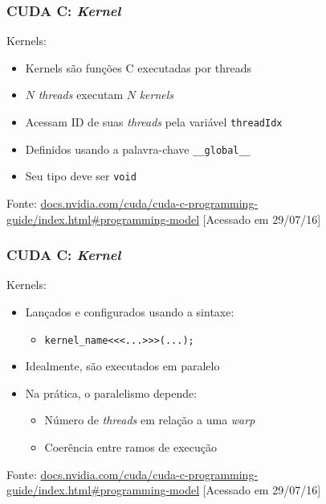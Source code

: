 \documentclass[10pt, compress]{beamer}
\begin{document}
\begin{frame}
    \frametitle{CUDA C: \textit{Kernel}}
    \alert{Kernels}:
    \begin{itemize}
        \item \alert{Kernels} são funções C executadas por \alert{threads}
        \item $N$ \textit{threads} executam $N$ \textit{kernels}
            \pause
        \item Acessam \alert{ID} de suas \textit{threads} pela variável \alert{\texttt{threadIdx}}
            \pause
        \item Definidos usando a palavra-chave \alert{\texttt{\_\_global\_\_}}
        \item Seu tipo deve ser \alert{\texttt{void}}
    \end{itemize}

    \vfill

    \begin{center}
        \tiny{Fonte: \url{docs.nvidia.com/cuda/cuda-c-programming-guide/index.html\#programming-model} [Acessado em 29/07/16]}
    \end{center}
\end{frame}

\begin{frame}
    \frametitle{CUDA C: \textit{Kernel}}
    \alert{Kernels}:
    \begin{itemize}
        \item Lançados e configurados usando a sintaxe:
            \begin{itemize}
                \item \texttt{kernel\_name\alert{<<<}...\alert{>>>}(...);}
            \end{itemize}
            \pause
        \item Idealmente, são executados em \alert{paralelo}
            \pause
        \item Na prática, o paralelismo depende:
            \begin{itemize}
                \item Número de \textit{threads} em relação a uma \textit{warp}
                    \pause
                \item Coerência entre ramos de execução
            \end{itemize}
    \end{itemize}

    \vfill

    \begin{center}
        \tiny{Fonte: \url{docs.nvidia.com/cuda/cuda-c-programming-guide/index.html\#programming-model} [Acessado em 29/07/16]}
    \end{center}
\end{frame}
\end{document}
